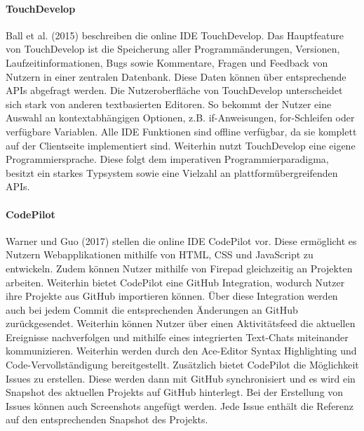 \paragraph{TouchDevelop}
Ball et al. (2015) \cite{ball_beyond_2015} beschreiben die online IDE TouchDevelop. Das Hauptfeature von TouchDevelop ist die Speicherung aller Programmänderungen, Versionen, Laufzeitinformationen, Bugs sowie Kommentare, Fragen und Feedback von Nutzern in einer zentralen Datenbank. Diese Daten können über entsprechende APIs abgefragt werden. Die Nutzeroberfläche von TouchDevelop unterscheidet sich stark von anderen textbasierten Editoren. So bekommt der Nutzer eine Auswahl an kontextabhängigen Optionen, z.B. if-Anweisungen, for-Schleifen oder verfügbare Variablen. Alle IDE Funktionen sind offline verfügbar, da sie komplett auf der Clientseite implementiert sind. Weiterhin nutzt TouchDevelop eine eigene Programmiersprache. Diese folgt dem imperativen Programmierparadigma, besitzt ein starkes Typsystem sowie eine Vielzahl an plattformübergreifenden APIs.

\paragraph{CodePilot}
Warner und Guo (2017) \cite{warner_codepilot_2017} stellen die online IDE CodePilot vor. Diese ermöglicht es Nutzern Webapplikationen mithilfe von HTML, CSS und JavaScript zu entwickeln. Zudem können Nutzer mithilfe von Firepad \cite{noauthor_firepad_nodate} gleichzeitig an Projekten arbeiten. Weiterhin bietet CodePilot eine GitHub \cite{noauthor_github_nodate} Integration, wodurch Nutzer ihre Projekte aus GitHub importieren können. Über diese Integration werden auch bei jedem Commit die entsprechenden Änderungen an GitHub zurückgesendet. Weiterhin können Nutzer über einen Aktivitätsfeed die aktuellen Ereignisse nachverfolgen und mithilfe eines integrierten Text-Chats miteinander kommunizieren. Weiterhin werden durch den Ace-Editor \cite{noauthor_ace_nodate} Syntax Highlighting und Code-Vervollständigung bereitgestellt. Zusätzlich bietet CodePilot die Möglichkeit Issues zu erstellen. Diese werden dann mit GitHub synchronisiert und es wird ein Snapshot des aktuellen Projekts auf GitHub hinterlegt. Bei der Erstellung von Issues können auch Screenshots angefügt werden. Jede Issue enthält die Referenz auf den entsprechenden Snapshot des Projekts.

